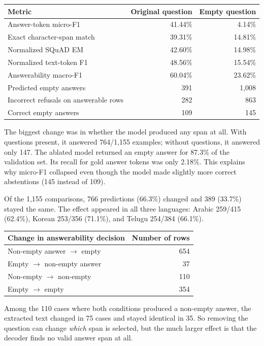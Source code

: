 \documentclass[10pt,a4paper]{article}
\newcommand{\sectionline}[1]{\vspace{2pt}{\large\bfseries #1}\par\vspace{0pt}}
\begin{document}
\sectionline{2. Main results}
\begin{center}
\begin{tabularx}{\linewidth}{@{}Yrr@{}}
\toprule
Metric & Original question & Empty question \\
\midrule
Answer-token micro-F1 & 41.44\% & 4.14\% \\
Exact character-span match & 39.31\% & 14.81\% \\
Normalized SQuAD EM & 42.60\% & 14.98\% \\
Normalized text-token F1 & 48.56\% & 15.54\% \\
Answerability macro-F1 & 60.04\% & 23.62\% \\
Predicted empty answers & 391 & 1,008 \\
Incorrect refusals on answerable rows & 282 & 863 \\
Correct empty answers & 109 & 145 \\
\bottomrule
\end{tabularx}
\end{center}
The biggest change was in whether the model produced any span at all. With questions present, it answered 764/1,155 examples; without questions, it answered only 147. The ablated model returned an empty answer for 87.3\% of the validation set. Its recall for gold answer tokens was only 2.18\%. This explains why micro-F1 collapsed even though the model made slightly more correct abstentions (145 instead of 109).

\sectionline{3. How many outputs actually changed?}
Of the 1,155 comparisons, 766 predictions (66.3\%) changed and 389 (33.7\%) stayed the same. The effect appeared in all three languages: Arabic 259/415 (62.4\%), Korean 253/356 (71.1\%), and Telugu 254/384 (66.1\%).

\begin{center}
\begin{tabular}{@{}l r@{}}
\toprule
Change in answerability decision & Number of rows \\
\midrule
Non-empty answer $\rightarrow$ empty & 654 \\
Empty $\rightarrow$ non-empty answer & 37 \\
Non-empty $\rightarrow$ non-empty & 110 \\
Empty $\rightarrow$ empty & 354 \\
\bottomrule
\end{tabular}
\end{center}
Among the 110 cases where both conditions produced a non-empty answer, the extracted text changed in 75 cases and stayed identical in 35. So removing the question can change \emph{which} span is selected, but the much larger effect is that the decoder finds no valid answer span at all.
\end{document}
